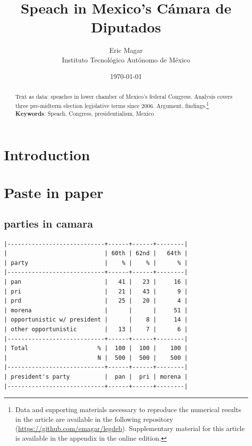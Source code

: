 \documentclass[letter,12pt]{article}
\begin{document}
\title{Speach in Mexico's Cámara de Diputados}
\author{Eric Magar \\ Instituto Tecnológico Autónomo de México}
\date{\today}
\maketitle

\newpage

\begin{abstract}
\noindent Text as data: speaches in lower chamber of Mexico's federal Congress. Analysis covers three pre-midterm election legislative terms since 2006. Argument, findings.\footnote{{Data and supporting materials necessary to reproduce the numerical results in the article are available in the following repository (\url{https://github.com/emagar/legdeb}). Supplementary material for this article is available in the appendix in the online edition.}}
\newline
\newline
\textbf{Keywords}: Speach, Congress, presidentialism, Mexico 
\end{abstract}

\newpage

\doublespacing

\section{Introduction}

\section{Paste in paper}

\subsection{parties in camara}

\singlespacing
\begin{footnotesize}
\begin{verbatim}
|----------------------------+------+------+--------|
|                            | 60th | 62nd |   64th |
| party                      |    % |    % |      % |
|----------------------------+------+------+--------|
| pan                        |   41 |   23 |     16 |
| pri                        |   21 |   43 |      9 |
| prd                        |   25 |   20 |      4 |
| morena                     |      |      |     51 |
| opportunistic w/ president |      |    8 |     14 |
| other opportunistic        |   13 |    7 |      6 |
|----------------------------+------+------+--------|
| Total                    % |  100 |  100 |    100 |
|                          N |  500 |  500 |    500 |
|----------------------------+------+------+--------|
| president's party          |  pan |  pri | morena |
|----------------------------+------+------+--------|
\end{verbatim}
\end{footnotesize}
\doublespacing
\end{document}
